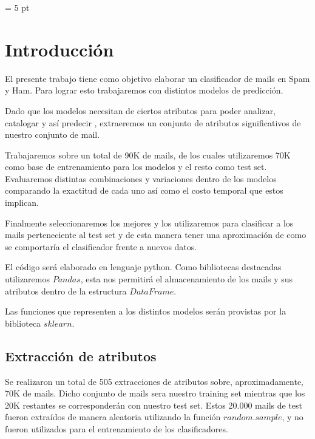 \documentclass[a4paper]{article}
\begin{document}
\parskip = 5 pt
\thispagestyle{empty}

\maketitle

\newpage
\tableofcontents
\thispagestyle{empty}

\newpage
\section{Introducción}
El presente trabajo tiene como objetivo elaborar un clasificador de mails en Spam y Ham. Para lograr esto trabajaremos con distintos modelos de predicción.

Dado que los modelos necesitan de ciertos atributos para poder analizar, catalogar y así predecir , extraeremos un conjunto de atributos significativos de nuestro conjunto de mail.

Trabajaremos sobre un total de 90K de mails, de los cuales utilizaremos 70K como base de entrenamiento para los modelos y el resto como test set. 
 Evaluaremos distintas combinaciones y variaciones dentro de los modelos comparando la exactitud de cada uno así como el costo temporal que estos implican. 
 
 Finalmente seleccionaremos los mejores y los utilizaremos para clasificar a los mails perteneciente al test set y de esta manera tener una aproximación de como se comportaría el clasificador frente a nuevos datos.  
 
El código será elaborado en lenguaje python. Como bibliotecas destacadas utilizaremos $Pandas$, esta nos permitirá el almacenamiento de los mails y sus atributos dentro de la estructura $DataFrame$.

Las funciones que representen a los distintos modelos serán provistas por la biblioteca $sklearn$.

\subsection{Extracción de atributos}
Se realizaron un total de 505 extracciones de atributos sobre, aproximadamente, 70K de mails. Dicho conjunto de mails sera nuestro training set mientras que los 20K restantes se corresponderán con nuestro test set. Estos 20.000 mails de test fueron extraídos de manera aleatoria utilizando la función $random.sample$, y no fueron utilizados para el entrenamiento de los clasificadores.
\end{document}
